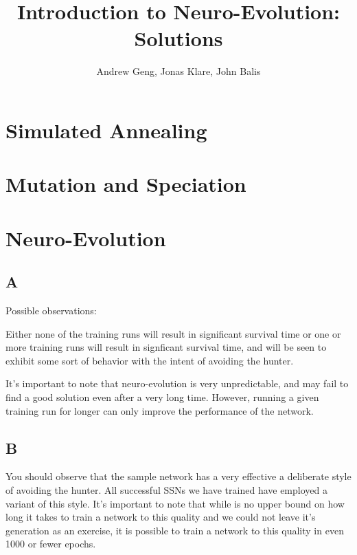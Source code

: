 \documentclass[12]{extarticle}
\begin{document}
\title{Introduction to Neuro-Evolution: Solutions}
\author{Andrew Geng, Jonas Klare, John Balis}




\maketitle





\section{Simulated Annealing}

\subsection{}

\subsection{}

\subsection{}

\section{Mutation and Speciation}


\section{Neuro-Evolution}
\subsection{A}
Possible observations: 

Either none of the training runs will result in significant survival time or one or more training runs will result in signficant survival time, and will be seen to exhibit  some sort of behavior with the intent of avoiding the hunter. 

It's important to note that neuro-evolution is very unpredictable, and may fail to find a good solution even after a very long time. However, running a given training run for longer can only improve the performance of the network.


\subsection{B}
 You should observe that the sample network has a very effective a deliberate style of avoiding the hunter. All successful SSNs we have trained have employed a variant of this style. It's important to note that while is no upper bound on how long it takes to train a network to this quality and we could not leave it's generation as an exercise, it is possible to train a network to this quality in even 1000 or fewer epochs. 
\end{document}
